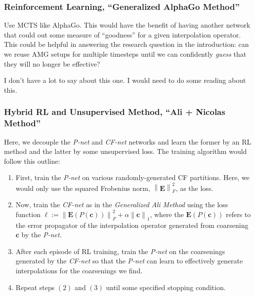 \documentclass{article}
\newcommand{\norm}[1]{\left\lVert#1\right\rVert}
\newcommand{\mat}[1]{\bm{{#1}}}
\renewcommand{\vec}[1]{\bm{{#1}}}
\begin{document}
\subsubsection{Reinforcement Learning, ``Generalized AlphaGo Method''}
Use MCTS like AlphaGo.  This would have the benefit of having another network that could out some measure of ``goodness'' for a given interpolation operator.  This could be helpful in answering the research question in the introduction: can we reuse AMG setups for multiple timesteps until we can confidently \textit{guess} that they will no longer be effective?

I don't have a lot to say about this one.  I would need to do some reading about this.
\subsubsection{Hybrid RL and Unsupervised Method, ``Ali + Nicolas Method''}
Here, we decouple the \textit{P-net} and \textit{CF-net} networks and learn the former by an RL method and the latter by some unsupervised loss.  The training algorithm would follow this outline:
\begin{enumerate}
\item First, train the \textit{P-net} on various randomly-generated CF partitions.  Here, we would only use the squared Frobenius norm, $\norm{\mat{E}}_F^2$, as the loss.
\item Now, train the \textit{CF-net} as in the \textit{Generalized Ali Method} using the loss function $\ell := \norm{\mat{E}\left(P\left(\vec{c}\right)\right)}_F^2 + \alpha\norm{\vec{c}}_1$, where the $\mat{E}\left(P\left(\vec{c}\right)\right)$ refers to the error propagator of the interpolation operator generated from coarsening $\vec{c}$ by the \textit{P-net}.
\item After each episode of RL training, train the \textit{P-net} on the coarsenings generated by the \textit{CF-net} so that the \textit{P-net} can learn to effectively generate interpolations for the coarsenings we find.
\item Repeat steps $(2)$ and $(3)$ until some specified stopping condition.
\end{enumerate}
\nocite{*}


\end{document}
